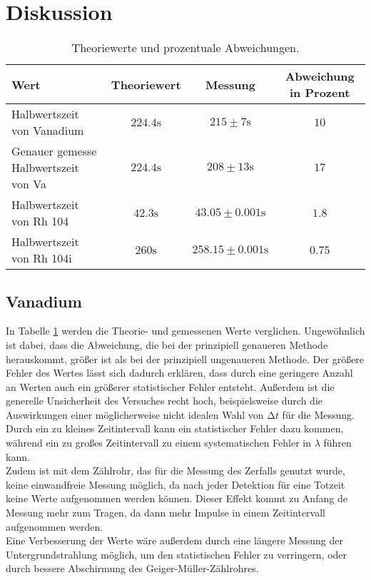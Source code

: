 \section{Diskussion}
\label{sec:Diskussion}

\begin{table}[H]
 \centering
 \caption{Theoriewerte und prozentuale Abweichungen.}
 \label{tab:theo}
 \begin{tabular}{lccc}
  \toprule
  Wert & Theoriewert & Messung & Abweichung in Prozent \\
  \midrule
  Halbwertszeit von Vanadium & $224.4 \si{\s}$ & $215 \pm 7 \si{\s}$ & $10$ \\
  Genauer gemesse Halbwertszeit von Va & $224.4 \si{\s}$ & $208 \pm 13 \si{\s}$ & $17$ \\
  Halbwertszeit von Rh 104 & $42.3 \si{\s}$ & $43.05 \pm 0.001 \si{\s}$ & $1.8$ \\
  Halbwertszeit von Rh 104i & $260 \si{\s}$ & $258.15 \pm 0.001 \si{\s}$ & $0.75$ \\
  \bottomrule
 \end{tabular}
\end{table}

\subsection{Vanadium}

In Tabelle \ref{tab:theo} werden die Theorie-  und gemessenen Werte verglichen.
Ungewöhnlich ist dabei, dass die Abweichung, die bei der prinzipiell genaueren Methode herauskommt,
größer ist als bei der prinzipiell ungenaueren Methode. 
Der größere Fehler des Wertes lässt sich dadurch erklären, dass durch eine geringere Anzahl an Werten auch ein größerer statistischer Fehler entsteht. 
Außerdem ist die generelle Unsicherheit des Versuches recht hoch, beispielsweise durch die Auswirkungen einer möglicherweise nicht idealen Wahl von $\increment t$
für die Messung. Durch ein zu kleines Zeitintervall kann ein statistischer Fehler dazu kommen, während ein zu großes Zeitintervall zu einem systematischen Fehler in 
$\lambda$ führen kann. \\
Zudem ist mit dem Zählrohr, das für die Messung des Zerfalls genutzt wurde, keine einwandfreie Messung möglich, da nach jeder Detektion für eine Totzeit keine Werte 
aufgenommen werden können. Dieser Effekt kommt zu Anfang de Messung mehr zum Tragen, da dann mehr Impulse in einem Zeitintervall aufgenommen werden.\\
Eine Verbesserung der Werte wäre außerdem durch eine längere Messung der Untergrundstrahlung möglich, um den statistischen Fehler zu verringern, oder durch bessere Abschirmung
des Geiger-Müller-Zählrohres.


